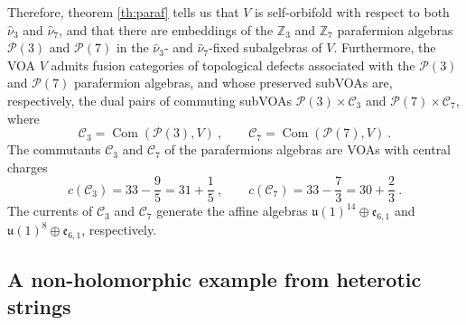 \documentclass[11pt,reqno]{article}
\newcommand{\be}{\begin{equation}}
\newcommand{\ee}{\end{equation}}
\DeclareMathOperator{\Com}{Com}
\newcommand{\ZZ}{\mathbb{Z}}
\newcommand{\paraf}{\mathcal{P}}
\newcommand{\alg}[1]{\mathfrak{#1}}
\begin{document}
Therefore, theorem \ref{th:paraf} tells us that $V$ is self-orbifold with respect to both $\hat \nu_3$ and $\hat \nu_7$, and that there are embeddings of the $\ZZ_3$ and $\ZZ_7$ parafermion algebras $\paraf(3)$ and $\paraf(7)$ in the $\hat \nu_3$- and $\hat\nu_7$-fixed subalgebras of $V$. Furthermore, the VOA $V$ admits fusion categories of topological defects associated with the $\paraf(3)$ and $\paraf(7)$ parafermion algebras, and whose preserved subVOAs are, respectively, the dual pairs of commuting subVOAs $\paraf(3)\times \mathcal{C}_3$ and $\paraf(7)\times \mathcal{C}_7$, where
\be \mathcal{C}_3=\Com(\paraf(3),V)\ ,\qquad \mathcal{C}_7=\Com(\paraf(7),V)\ .
\ee The commutants $\mathcal{C}_3$ and $\mathcal{C}_7$ of the parafermions algebras are VOAs with central charges
\be c(\mathcal{C}_3)=33-\frac{9}{5}=31+\frac{1}{5}\ ,\qquad c(\mathcal{C}_7)=33-\frac{7}{3}=30+\frac{2}{3}\ .
\ee The currents of  $\mathcal{C}_3$ and $\mathcal{C}_7$ generate the affine algebras $\mathfrak{u}(1)^{14}\oplus \alg{e}_{6,1}$ and $\mathfrak{u}(1)^{8}\oplus \alg{e}_{6,1}$, respectively.

\subsection{A non-holomorphic example from heterotic strings}
\end{document}
